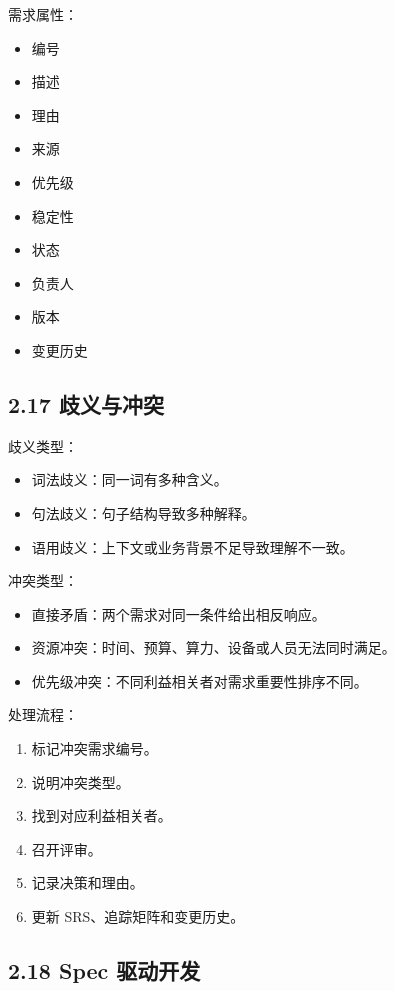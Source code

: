 \documentclass[UTF8,zihao=-4]{ctexart}
\begin{document}
需求属性：

\begin{itemize}
\item 编号
\item 描述
\item 理由
\item 来源
\item 优先级
\item 稳定性
\item 状态
\item 负责人
\item 版本
\item 变更历史
\end{itemize}

\subsection{2.17 歧义与冲突}

歧义类型：

\begin{itemize}
\item 词法歧义：同一词有多种含义。
\item 句法歧义：句子结构导致多种解释。
\item 语用歧义：上下文或业务背景不足导致理解不一致。
\end{itemize}

冲突类型：

\begin{itemize}
\item 直接矛盾：两个需求对同一条件给出相反响应。
\item 资源冲突：时间、预算、算力、设备或人员无法同时满足。
\item 优先级冲突：不同利益相关者对需求重要性排序不同。
\end{itemize}

处理流程：

\begin{enumerate}
\item 标记冲突需求编号。
\item 说明冲突类型。
\item 找到对应利益相关者。
\item 召开评审。
\item 记录决策和理由。
\item 更新 SRS、追踪矩阵和变更历史。
\end{enumerate}

\subsection{2.18 Spec 驱动开发}
\end{document}
